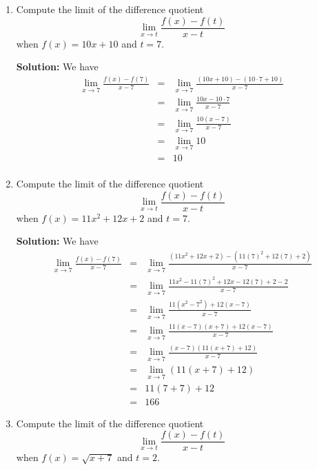 \documentclass{article}
\begin{document}
\ActivityTitle[class=Calculus I, number=2, name=Continuity (Solutions)]

\begin{enumerate}
\item Compute the limit of the difference quotient \[ \lim_{x \rightarrow t} \frac{f(x) - f(t)}{x - t} \] when $f(x) = 10 x + 10$ and $t = 7$.

\textbf{Solution:} We have
\begin{eqnarray*}
\lim_{x \rightarrow 7} \frac{f(x) - f(7)}{x - 7} & = & \lim_{x \rightarrow 7} \frac{(10 x + 10) - (10 \cdot 7 + 10)}{x - 7} \\
 & = & \lim_{x \rightarrow 7} \frac{10 x - 10 \cdot 7}{x - 7} \\
 & = & \lim_{x \rightarrow 7} \frac{10(x - 7)}{x - 7} \\
 & = & \lim_{x \rightarrow 7} 10 \\
 & = & 10 \\
\end{eqnarray*}


  
\vspace{1cm}

\item Compute the limit of the difference quotient \[ \lim_{x \rightarrow t} \frac{f(x) - f(t)}{x - t} \] when $f(x) = 11 x^2 + 12 x + 2$ and $t = 7$.

\textbf{Solution:} We have
\begin{eqnarray*}
\lim_{x \rightarrow 7} \frac{f(x) - f(7)}{x - 7} & = & \lim_{x \rightarrow 7} \frac{(11 x^2 + 12 x + 2) - (11 (7)^2 + 12(7) + 2)}{x - 7} \\
 & = & \lim_{x \rightarrow 7} \frac{11 x^2 - 11(7)^2 + 12 x - 12(7) + 2 - 2}{x - 7} \\
 & = & \lim_{x \rightarrow 7} \frac{11(x^2 - 7^2) + 12(x - 7)}{x - 7} \\
 & = & \lim_{x \rightarrow 7} \frac{11(x - 7)(x + 7) + 12(x - 7)}{x - 7} \\
 & = & \lim_{x \rightarrow 7} \frac{(x - 7)(11(x + 7) + 12)}{x - 7} \\
 & = & \lim_{x \rightarrow 7} \left( 11(x + 7) + 12 \right) \\
 & = & 11(7 + 7) + 12\\
 & = & 166
\end{eqnarray*}


  
\vspace{1cm}

\item Compute the limit of the difference quotient \[ \lim_{x \rightarrow t} \frac{f(x) - f(t)}{x - t} \] when $f(x) = \sqrt{x + 7}$ and $t = 2$.


\end{enumerate}
\end{document}
